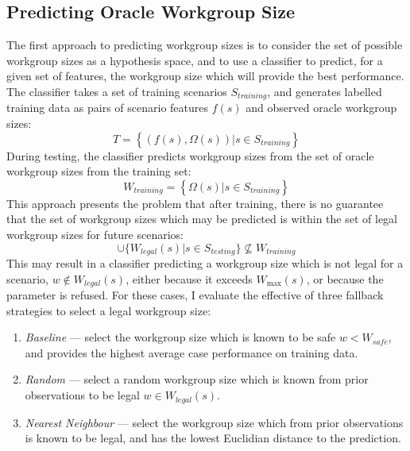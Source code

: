\subsection{Predicting Oracle Workgroup Size}

The first approach to predicting workgroup sizes is to consider the
set of possible workgroup sizes as a hypothesis space, and to use a
classifier to predict, for a given set of features, the workgroup size
which will provide the best performance. The classifier takes a set of
training scenarios $S_{training}$, and generates labelled training
data as pairs of scenario features $f(s)$ and observed oracle
workgroup sizes:
%
\begin{equation}
  T = \left\{ \left(f(s), \Omega(s)\right) | s \in S_{training} \right\}
\end{equation}
%
During testing, the classifier predicts workgroup sizes from the set
of oracle workgroup sizes from the training set:
%
\begin{equation}
  W_{training} = \left\{ \Omega(s) | s \in S_{training} \right\}
\end{equation}
%
This approach presents the problem that after training, there is no
guarantee that the set of workgroup sizes which may be predicted is
within the set of legal workgroup sizes for future scenarios:
%
\begin{equation}
  \cup \{ W_{legal}(s) | s \in S_{testing} \} \nsubseteq W_{training}
\end{equation}
%
This may result in a classifier predicting a workgroup size which is
not legal for a scenario, $w \not\in W_{legal}(s)$, either because it
exceeds $W_{\max}(s)$, or because the parameter is refused. For these
cases, I evaluate the effective of three fallback strategies to select
a legal workgroup size:

\begin{enumerate}
\item \emph{Baseline} --- select the workgroup size which is known to
  be safe $w < W_{safe}$, and provides the highest average case
  performance on training data.
\item \emph{Random} --- select a random workgroup size which is known
  from prior observations to be legal $w \in W_{legal}(s)$.
\item \emph{Nearest Neighbour} --- select the workgroup size which
  from prior observations is known to be legal, and has the lowest
  Euclidian distance to the prediction.
\end{enumerate}

